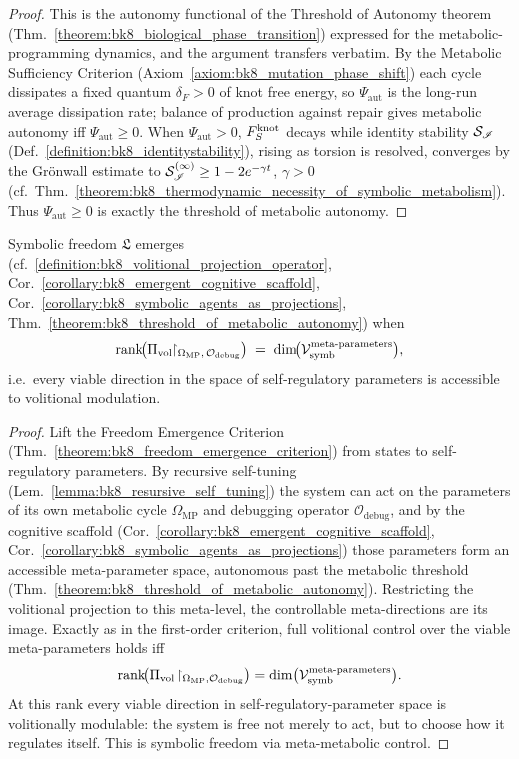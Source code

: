 \begin{proof}
\label{proof:bk8_threshold_of_metabolic_autonomy}
\leavevmode
This is the autonomy functional of the Threshold of Autonomy theorem (Thm.~\ref{theorem:bk8_biological_phase_transition}) expressed for the metabolic-programming dynamics, and the argument transfers verbatim. By the Metabolic Sufficiency Criterion (Axiom~\ref{axiom:bk8_mutation_phase_shift}) each cycle dissipates a fixed quantum $\delta_F>0$ of knot free energy, so $\Psi_{\mathrm{aut}}$ is the long-run average dissipation rate; balance of production against repair gives metabolic autonomy iff $\Psi_{\mathrm{aut}}\ge 0$. When $\Psi_{\mathrm{aut}}>0$, $F_S^{\text{knot}}$ decays while identity stability $\mathcal{S}_{\mathscr{I}}$ (Def.~\ref{definition:bk8_identitystability}), rising as torsion is resolved, converges by the Grönwall estimate to $\mathcal{S}_{\mathscr{I}}^{(\infty)}\ge 1-2e^{-\gamma t}$, $\gamma>0$ (cf.~Thm.~\ref{theorem:bk8_thermodynamic_necessity_of_symbolic_metabolism}). Thus $\Psi_{\mathrm{aut}}\ge 0$ is exactly the threshold of metabolic autonomy.
\end{proof}
\begin{theorem}
\label{theorem:bk8_freedom_via_meta_metabolic_control}
Symbolic freedom $\mathfrak{L}$ emerges (cf.~\ref{definition:bk8_volitional_projection_operator}, Cor.~\ref{corollary:bk8_emergent_cognitive_scaffold}, Cor.~\ref{corollary:bk8_symbolic_agents_as_projections}, Thm.~\ref{theorem:bk8_threshold_of_metabolic_autonomy}) when
\[
\operatorname{rank}\!\bigl(
  \Pi_{\mathrm{vol}}
    \!\!\restriction_{\Omega_{\mathrm{MP}},\,\mathcal{O}_{\mathrm{debug}}}
\bigr)
  \;=\;
  \dim\!\bigl(\mathcal{V}_{\mathrm{symb}}^{\text{meta‑parameters}}\bigr),
\]
i.e.\ every viable direction in the space of self‑regulatory parameters
is accessible to volitional modulation.
\end{theorem}
\begin{proof}
\label{proof:bk8_freedom_via_meta_metabolic_control}
\leavevmode
Lift the Freedom Emergence Criterion (Thm.~\ref{theorem:bk8_freedom_emergence_criterion}) from states to self-regulatory parameters. By recursive self-tuning (Lem.~\ref{lemma:bk8_resursive_self_tuning}) the system can act on the parameters of its own metabolic cycle $\Omega_{\mathrm{MP}}$ and debugging operator $\mathcal{O}_{\mathrm{debug}}$, and by the cognitive scaffold (Cor.~\ref{corollary:bk8_emergent_cognitive_scaffold}, Cor.~\ref{corollary:bk8_symbolic_agents_as_projections}) those parameters form an accessible meta-parameter space, autonomous past the metabolic threshold (Thm.~\ref{theorem:bk8_threshold_of_metabolic_autonomy}). Restricting the volitional projection to this meta-level, the controllable meta-directions are its image. Exactly as in the first-order criterion, full volitional control over the viable meta-parameters holds iff
\[
\operatorname{rank}\!\bigl(\Pi_{\mathrm{vol}}\!\restriction_{\Omega_{\mathrm{MP}},\mathcal{O}_{\mathrm{debug}}}\bigr)=\dim\bigl(\mathcal{V}_{\mathrm{symb}}^{\text{meta-parameters}}\bigr).
\]
At this rank every viable direction in self-regulatory-parameter space is volitionally modulable: the system is free not merely to act, but to choose how it regulates itself. This is symbolic freedom via meta-metabolic control.
\end{proof}

